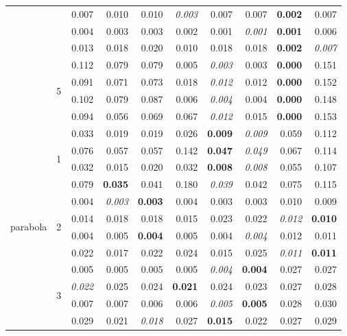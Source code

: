 \documentclass[authoryear, review, 11pt]{elsarticle}
\begin{document}
\begin{table}
\begin{center}
{\begin{tabular}{ccrrrrrrrr}
   &  & 0.007 & 0.010 & 0.010 & \emph{0.003} & 0.007 & 0.007 & \textbf{0.002} & 0.007 \\ 
   &  & 0.004 & 0.003 & 0.003 & 0.002 & 0.001 & \emph{0.001} & \textbf{0.001} & 0.006 \\ 
   &  & 0.013 & 0.018 & 0.020 & 0.010 & 0.018 & 0.018 & \textbf{0.002} & \emph{0.007} \\ 
  \cline{3-10}
   & \multirow{4}{*}{5} & 0.112 & 0.079 & 0.079 & 0.005 & \emph{0.003} & 0.003 & \textbf{0.000} & 0.151 \\ 
   &  & 0.091 & 0.071 & 0.073 & 0.018 & \emph{0.012} & 0.012 & \textbf{0.000} & 0.152 \\ 
   &  & 0.102 & 0.079 & 0.087 & 0.006 & \emph{0.004} & 0.004 & \textbf{0.000} & 0.148 \\ 
   &  & 0.094 & 0.056 & 0.069 & 0.067 & \emph{0.012} & 0.015 & \textbf{0.000} & 0.153 \\ 
  \hline
  \multirow{20}{*}{parabola} & \multirow{4}{*}{1} & 0.033 & 0.019 & 0.019 & 0.026 & \textbf{0.009} & \emph{0.009} & 0.059 & 0.112 \\ 
   &  & 0.076 & 0.057 & 0.057 & 0.142 & \textbf{0.047} & \emph{0.049} & 0.067 & 0.114 \\ 
   &  & 0.032 & 0.015 & 0.020 & 0.032 & \textbf{0.008} & \emph{0.008} & 0.055 & 0.107 \\ 
   &  & 0.079 & \textbf{0.035} & 0.041 & 0.180 & \emph{0.039} & 0.042 & 0.075 & 0.115 \\ 
  \cline{3-10}
   & \multirow{4}{*}{2} & 0.004 & \emph{0.003} & \textbf{0.003} & 0.004 & 0.003 & 0.003 & 0.010 & 0.009 \\ 
   &  & 0.014 & 0.018 & 0.018 & 0.015 & 0.023 & 0.022 & \emph{0.012} & \textbf{0.010} \\ 
   &  & 0.004 & 0.005 & \textbf{0.004} & 0.005 & 0.004 & \emph{0.004} & 0.012 & 0.011 \\ 
   &  & 0.022 & 0.017 & 0.022 & 0.024 & 0.015 & 0.025 & \emph{0.011} & \textbf{0.011} \\ 
  \cline{3-10}
   & \multirow{4}{*}{3} & 0.005 & 0.005 & 0.005 & 0.005 & \emph{0.004} & \textbf{0.004} & 0.027 & 0.027 \\ 
   &  & \emph{0.022} & 0.025 & 0.024 & \textbf{0.021} & 0.024 & 0.023 & 0.027 & 0.028 \\ 
   &  & 0.007 & 0.007 & 0.006 & 0.006 & \emph{0.005} & \textbf{0.005} & 0.028 & 0.030 \\ 
   &  & 0.029 & 0.021 & \emph{0.018} & 0.027 & \textbf{0.015} & 0.022 & 0.027 & 0.029 \\ 

\end{tabular}}
\end{center}
\end{table}
\end{document}
